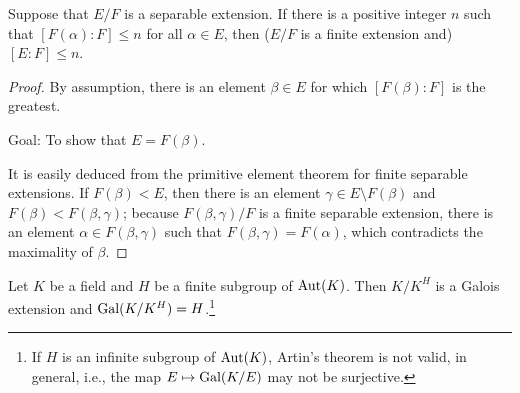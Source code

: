 \begin{prop}
    Suppose that $E/F$ is a separable extension.
    If there is a positive integer $n$ such that $[F(\alpha): F]\leq n$ for all $\alpha\in E$, then ($E/F$ is a finite extension and) $[E:F]\leq n$. 
\end{prop}
\begin{proof}
    By assumption, there is an element $\beta\in E$ for which $[F(\beta): F]$ is the greatest.
    \begin{center}
        Goal: To show that $E=F(\beta)$.
    \end{center}
    It is easily deduced from the primitive element theorem for finite separable extensions.
    If $F(\beta)<E$, then there is an element $\gamma\in E\setminus F(\beta)$ and $F(\beta)<F(\beta, \gamma)$; because $F(\beta, \gamma)/F$ is a finite separable extension, there is an element $\alpha\in F(\beta, \gamma)$ such that $F(\beta, \gamma)=F(\alpha)$, which contradicts the maximality of $\beta$.
\end{proof}
\begin{lem}
    Let $K$ be a field and $H$ be a finite subgroup of ${\textrm{Aut}({K})}$.
    Then $K/K^H$ is a Galois extension and ${\textrm{Gal}({K/K^H})}=H$.\footnote{If $H$ is an infinite subgroup of ${\textrm{Aut}({K})}$, Artin's theorem is not valid, in general, i.e., the map $E\mapsto{\textrm{Gal}({K/E})}$ may not be surjective.}
\end{lem}
